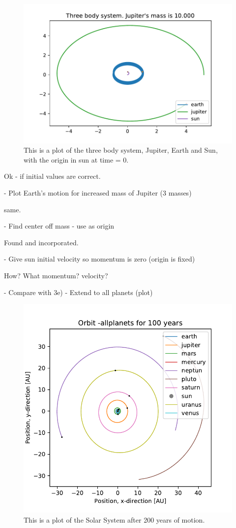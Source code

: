 \begin{figure}[H]
\includegraphics[width=0.9\linewidth]{../results/plots/Jupitermass_is_1_0000_earth.pdf}\caption{This is a plot of the three body system, Jupiter, Earth and Sun, with the origin in sun at time = 0.}\label{fig:three_body_sun_origin}
\end{figure}

	Ok - if initial values are correct.
	
	- Plot Earth's motion for increased mass of Jupiter (3 masses)

	same.	
	
	- Find center off mass - use as origin

	Found and incorporated.	
	
	- Give sun initial velocity so momentum is zero (origin is fixed)

	How? What momentum? velocity?	
	
	- Compare with 3e)
	- Extend to all planets (plot)
	
\begin{figure}[H]
\includegraphics[width=1\linewidth]{../results/plots/plotof-earthjupiter-allplanets.pdf}\caption{This is a plot of the Solar System after 200 years of motion.}\label{fig:solarsystem_allplanets}
\end{figure}


